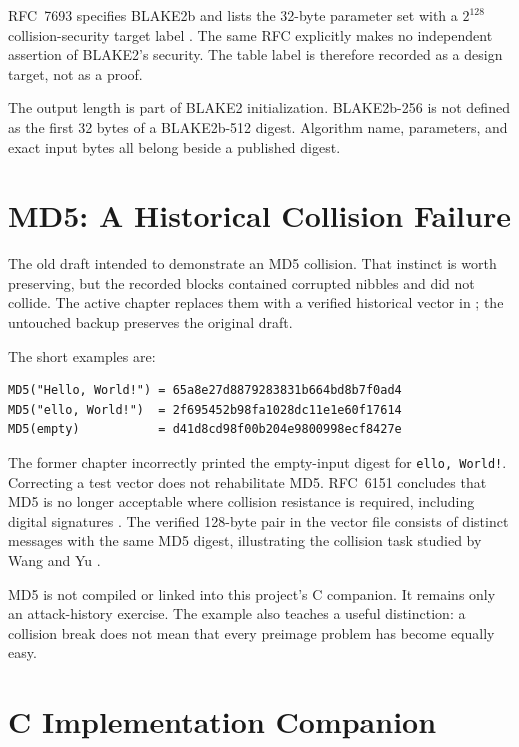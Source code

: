 RFC~7693 specifies BLAKE2b and lists the 32-byte parameter set with a
\(2^{128}\) collision-security target label \cite{saarinen2015blake2}. The same
RFC explicitly makes no independent assertion of BLAKE2's security. The table
label is therefore recorded as a design target, not as a proof.

The output length is part of BLAKE2 initialization. BLAKE2b-256 is not defined
as the first 32 bytes of a BLAKE2b-512 digest. Algorithm name, parameters, and
exact input bytes all belong beside a published digest.

\section{MD5: A Historical Collision Failure}

The old draft intended to demonstrate an MD5 collision. That instinct is worth
preserving, but the recorded blocks contained corrupted nibbles and did not
collide. The active chapter replaces them with a verified historical vector in
; the untouched backup preserves the
original draft.

The short examples are:

\begin{verbatim}
MD5("Hello, World!") = 65a8e27d8879283831b664bd8b7f0ad4
MD5("ello, World!")  = 2f695452b98fa1028dc11e1e60f17614
MD5(empty)           = d41d8cd98f00b204e9800998ecf8427e
\end{verbatim}

The former chapter incorrectly printed the empty-input digest for
\texttt{ello, World!}. Correcting a test vector does not rehabilitate MD5.
RFC~6151 concludes that MD5 is no longer acceptable where collision resistance
is required, including digital signatures \cite{rfc6151md5}. The verified
128-byte pair in the vector file consists of distinct messages with the same
MD5 digest, illustrating the collision task studied by Wang and Yu
\cite{wang2005md5}.

MD5 is not compiled or linked into this project's C companion. It remains only
an attack-history exercise. The example also teaches a useful distinction: a
collision break does not mean that every preimage problem has become equally
easy.

\section{C Implementation Companion}

